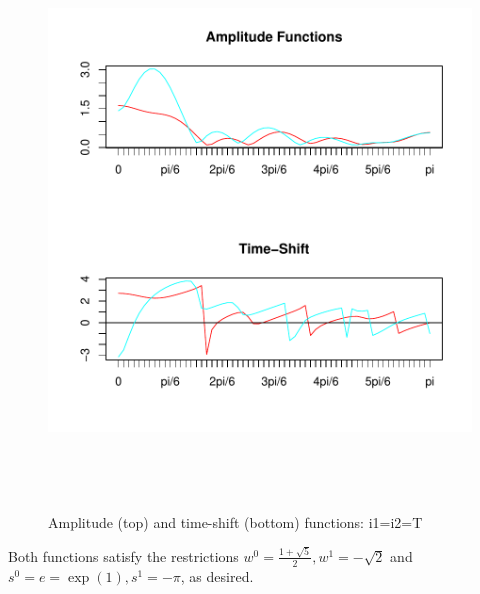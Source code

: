 \documentclass[a4paper]{book}
\begin{document}
\begin{enumerate}
\begin{figure}[H]\begin{center}\includegraphics[height=6in, width=6in]{z_mdfa_ar1_amp_shift_Lag_0_iT_i2T.pdf}\caption{Amplitude (top) and time-shift (bottom) functions: i1=i2=T\label{z_mdfa_ar1_amp_shift_Lag_0_iT_i2T}}\end{center}\end{figure}Both functions satisfy the restrictions $w^0=\frac{1+\sqrt{5}}{2},w^1=-\sqrt{2}$ and $s^0=e=\exp(1),s^1=-\pi$, as desired. 


\end{enumerate}
\end{document}
